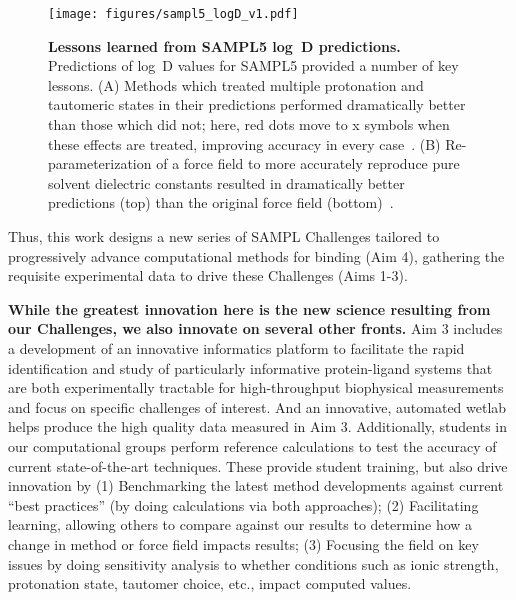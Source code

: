 \documentclass[11pt]{article}
\begin{document}
\begin{figure}
\vspace{-0.25in}
\begin{centering}
\texttt{[image: figures/sampl5\_logD\_v1.pdf]}

\end{centering}
\footnotesize
\caption{\label{figure:sampl5_logD}  
\textbf{Lessons learned from SAMPL5 log~D predictions.} 
Predictions of log~D values for SAMPL5 provided a number of key lessons. (A) Methods which treated multiple protonation and tautomeric states in their predictions performed dramatically better than those which did not; here, red dots move to x symbols when these effects are treated, improving accuracy in every case~\cite{Pickard:2016:JComputAidedMolDes}. (B) Re-parameterization of a force field to more accurately reproduce pure solvent dielectric constants resulted in dramatically better predictions (top) than the original force field (bottom)~\cite{paranahewage_predicting_2016}. 
}
\end{figure}

Thus, this work designs a new series of SAMPL Challenges tailored to progressively advance computational methods for binding (Aim 4), gathering the requisite experimental data to drive these Challenges (Aims 1-3). 

\textbf{While the greatest innovation here is the new science resulting from our Challenges, we also innovate on several other fronts.}
Aim 3 includes a development of an innovative informatics platform to facilitate the rapid identification and study of particularly informative protein-ligand systems that are both experimentally tractable for high-throughput biophysical measurements and focus on specific challenges of interest.
And an innovative, automated wetlab helps produce the high quality data measured in Aim 3. 
Additionally, students in our computational groups perform reference calculations to test the accuracy of current state-of-the-art techniques.
These provide student training, but also drive innovation by (1) Benchmarking the latest method developments against current ``best practices'' (by doing calculations via both approaches); (2) Facilitating learning, allowing others to compare against our results to determine how a change in method or force field impacts results; (3) Focusing the field on key issues by doing sensitivity analysis to whether conditions such as ionic strength, protonation state, tautomer choice, etc., impact computed values.
\end{document}
